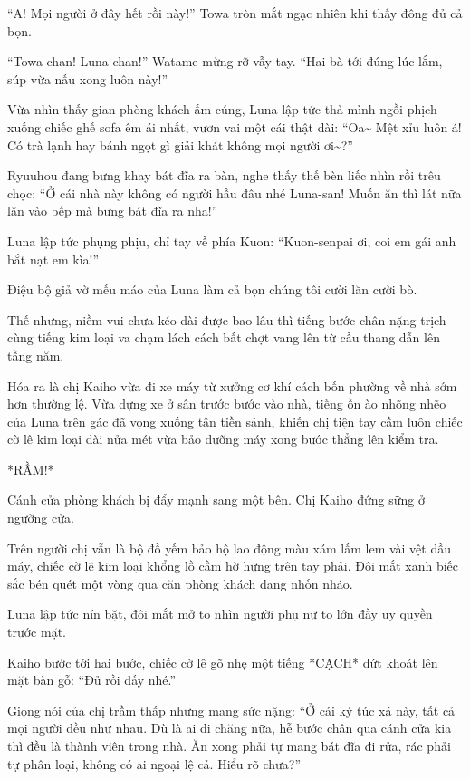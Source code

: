\documentclass[../main.tex]{subfiles}
\begin{document}
``A! Mọi người ở đây hết rồi này!'' Towa tròn mắt ngạc nhiên khi thấy đông đủ cả bọn.

``Towa-chan! Luna-chan!'' Watame mừng rỡ vẫy tay. ``Hai bà tới đúng lúc lắm, súp vừa nấu xong luôn này!''

Vừa nhìn thấy gian phòng khách ấm cúng, Luna lập tức thả mình ngồi phịch xuống chiếc ghế sofa êm ái nhất, vươn vai một cái thật dài: ``Oa\~{} Mệt xỉu luôn á! Có trà lạnh hay bánh ngọt gì giải khát không mọi người ơi\~{}?''

Ryuuhou đang bưng khay bát đĩa ra bàn, nghe thấy thế bèn liếc nhìn rồi trêu chọc: ``Ở cái nhà này không có người hầu đâu nhé Luna-san! Muốn ăn thì lát nữa lăn vào bếp mà bưng bát đĩa ra nha!''

Luna lập tức phụng phịu, chỉ tay về phía Kuon: ``Kuon-senpai ơi, coi em gái anh bắt nạt em kìa!''

Điệu bộ giả vờ mếu máo của Luna làm cả bọn chúng tôi cười lăn cười bò.

Thế nhưng, niềm vui chưa kéo dài được bao lâu thì tiếng bước chân nặng trịch cùng tiếng kim loại va chạm lách cách bất chợt vang lên từ cầu thang dẫn lên tầng năm.

Hóa ra là chị Kaiho vừa đi xe máy từ xưởng cơ khí cách bốn phường về nhà sớm hơn thường lệ. Vừa dựng xe ở sân trước bước vào nhà, tiếng ồn ào nhõng nhẽo của Luna trên gác đã vọng xuống tận tiền sảnh, khiến chị tiện tay cầm luôn chiếc cờ lê kim loại dài nửa mét vừa bảo dưỡng máy xong bước thẳng lên kiểm tra.

*RẦM!*

Cánh cửa phòng khách bị đẩy mạnh sang một bên. Chị Kaiho đứng sững ở ngưỡng cửa.

Trên người chị vẫn là bộ đồ yếm bảo hộ lao động màu xám lấm lem vài vệt dầu máy, chiếc cờ lê kim loại khổng lồ cầm hờ hững trên tay phải. Đôi mắt xanh biếc sắc bén quét một vòng qua căn phòng khách đang nhốn nháo.

Luna lập tức nín bặt, đôi mắt mở to nhìn người phụ nữ to lớn đầy uy quyền trước mặt.

Kaiho bước tới hai bước, chiếc cờ lê gõ nhẹ một tiếng *CẠCH* dứt khoát lên mặt bàn gỗ: ``Đủ rồi đấy nhé.''

Giọng nói của chị trầm thấp nhưng mang sức nặng: ``Ở cái ký túc xá này, tất cả mọi người đều như nhau. Dù là ai đi chăng nữa, hễ bước chân qua cánh cửa kia thì đều là thành viên trong nhà. Ăn xong phải tự mang bát đĩa đi rửa, rác phải tự phân loại, không có ai ngoại lệ cả. Hiểu rõ chưa?''
\end{document}
